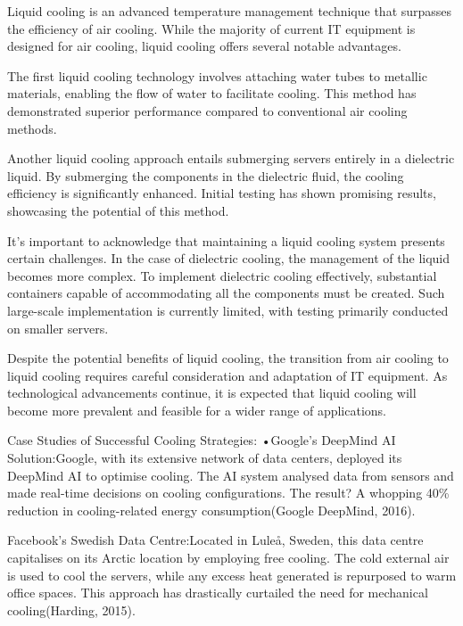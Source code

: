 \documentclass[
  a4paper,  %
  twoside,  %
  bibliography=totoc,
  headsepline,
  cleardoublepage=empty,
  parskip=half,
  draft=false
]{scrbook}
\begin{document}
Liquid cooling is an advanced temperature management technique that surpasses the efficiency of air cooling. While the majority of current IT equipment is designed for air cooling, liquid cooling offers several notable advantages.

The first liquid cooling technology involves attaching water tubes to metallic materials, enabling the flow of water to facilitate cooling. This method has demonstrated superior performance compared to conventional air cooling methods.

Another liquid cooling approach entails submerging servers entirely in a dielectric liquid. By submerging the components in the dielectric fluid, the cooling efficiency is significantly enhanced. Initial testing has shown promising results, showcasing the potential of this method.

It's important to acknowledge that maintaining a liquid cooling system presents certain challenges. In the case of dielectric cooling, the management of the liquid becomes more complex. To implement dielectric cooling effectively, substantial containers capable of accommodating all the components must be created. Such large-scale implementation is currently limited, with testing primarily conducted on smaller servers.

Despite the potential benefits of liquid cooling, the transition from air cooling to liquid cooling requires careful consideration and adaptation of IT equipment. As technological advancements continue, it is expected that liquid cooling will become more prevalent and feasible for a wider range of applications.


Case Studies of Successful Cooling Strategies:
•Google's  DeepMind  AI  Solution:Google,  with  its  extensive  network  of  data centers, deployed its DeepMind AI to optimise cooling. The AI system analysed data from sensors and  made  real-time  decisions on  cooling  configurations.  The  result?  A  whopping  40\% reduction in cooling-related energy consumption(Google DeepMind, 2016).

Facebook's Swedish Data Centre:Located in Luleå, Sweden, this data centre capitalises on its Arctic location by employing free cooling. The cold external air is used to cool the servers, while any excess heat generated is repurposed to warm office spaces. This approach has drastically curtailed the need for mechanical cooling(Harding, 2015).



\end{document}
